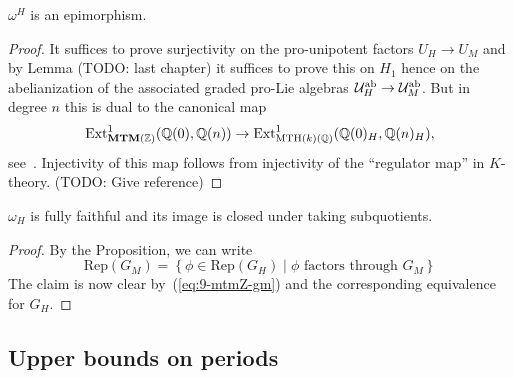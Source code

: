 \begin{prop}
  $\omega^{H}$ is an epimorphism.
\end{prop}
\begin{proof}
  It suffices to prove surjectivity on the pro-unipotent factors
  $U_{H}\to U_{M}$ and by Lemma (TODO: last chapter) it suffices to
  prove this on $H_{1}$ hence on the abelianization of the associated
  graded pro-Lie algebras ${\cal U}_{H}^{\mathrm{ab}}\to{\cal
    U}_{M}^{\mathrm{ab}}$. But in degree $n$ this is dual to the
  canonical map
  \begin{equation*}
    \mathrm{Ext}^{1}_{\mathbf{MTM}(\mathbb{Z})}(\mathbb{Q}(0),\mathbb{Q}(n))\to \mathrm{Ext}^{1}_{\mathrm{MTH}(k)(\mathbb{Q})}(\mathbb{Q}(0)_{H},\mathbb{Q}(n)_{H}),
  \end{equation*}
  see~\cite[A.15]{deligne-goncharov05}. Injectivity of this map
  follows from injectivity of the ``regulator map'' in
  $K$-theory. (TODO: Give reference)%
\end{proof}

\begin{cor}\label{cor:9-mixed-hodge-tate-realization}
  $\omega_{H}$ is fully faithful and its image is closed under taking
  subquotients.
\end{cor}
\begin{proof}
  By the Proposition, we can write
  \begin{equation*}
    \mathrm{Rep}(G_M) = \left\{ \phi \in \mathrm{Rep}(G_H) \mid \textrm{$\phi$ factors through $G_M$} \right\}    
  \end{equation*}
  The claim is now clear by~(\ref{eq:9-mtmZ-gm}) and the corresponding
  equivalence for $G_{H}$.
\end{proof}

\subsection{Upper bounds on periods}

